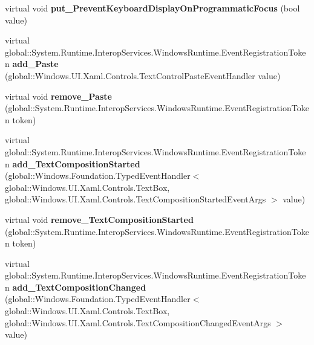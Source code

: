 \begin{DoxyCompactItemize}
\mbox{\label{class_windows_1_1_u_i_1_1_xaml_1_1_controls_1_1_text_box_aeb5452275c88b059cb6fcab37f2c0547}} 
virtual void {\bfseries put\+\_\+\+Prevent\+Keyboard\+Display\+On\+Programmatic\+Focus} (bool value)
\item 
\mbox{\label{class_windows_1_1_u_i_1_1_xaml_1_1_controls_1_1_text_box_a228a83caf2e3f6ac77d710ba279dfb6e}} 
virtual global\+::\+System.\+Runtime.\+Interop\+Services.\+Windows\+Runtime.\+Event\+Registration\+Token {\bfseries add\+\_\+\+Paste} (global\+::\+Windows.\+U\+I.\+Xaml.\+Controls.\+Text\+Control\+Paste\+Event\+Handler value)
\item 
\mbox{\label{class_windows_1_1_u_i_1_1_xaml_1_1_controls_1_1_text_box_affd66f6fbd07759509d7f75dab0e7186}} 
virtual void {\bfseries remove\+\_\+\+Paste} (global\+::\+System.\+Runtime.\+Interop\+Services.\+Windows\+Runtime.\+Event\+Registration\+Token token)
\item 
\mbox{\label{class_windows_1_1_u_i_1_1_xaml_1_1_controls_1_1_text_box_a7ee5e64932c7b9974d38444e13822e2c}} 
virtual global\+::\+System.\+Runtime.\+Interop\+Services.\+Windows\+Runtime.\+Event\+Registration\+Token {\bfseries add\+\_\+\+Text\+Composition\+Started} (global\+::\+Windows.\+Foundation.\+Typed\+Event\+Handler$<$ global\+::\+Windows.\+U\+I.\+Xaml.\+Controls.\+Text\+Box, global\+::\+Windows.\+U\+I.\+Xaml.\+Controls.\+Text\+Composition\+Started\+Event\+Args $>$ value)
\item 
\mbox{\label{class_windows_1_1_u_i_1_1_xaml_1_1_controls_1_1_text_box_ad3e96b82e37de938e7295300b6dc9c44}} 
virtual void {\bfseries remove\+\_\+\+Text\+Composition\+Started} (global\+::\+System.\+Runtime.\+Interop\+Services.\+Windows\+Runtime.\+Event\+Registration\+Token token)
\item 
\mbox{\label{class_windows_1_1_u_i_1_1_xaml_1_1_controls_1_1_text_box_a4ea12e73d910d27530312ae26996c11a}} 
virtual global\+::\+System.\+Runtime.\+Interop\+Services.\+Windows\+Runtime.\+Event\+Registration\+Token {\bfseries add\+\_\+\+Text\+Composition\+Changed} (global\+::\+Windows.\+Foundation.\+Typed\+Event\+Handler$<$ global\+::\+Windows.\+U\+I.\+Xaml.\+Controls.\+Text\+Box, global\+::\+Windows.\+U\+I.\+Xaml.\+Controls.\+Text\+Composition\+Changed\+Event\+Args $>$ value)

\end{DoxyCompactItemize}
